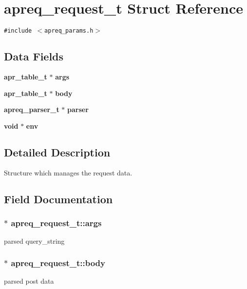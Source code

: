 \section{apreq\_\-request\_\-t  Struct Reference}
\label{structapreq__request__t}
{\tt \#include $<$apreq\_\-params.h$>$}

\subsection*{Data Fields}
\begin{CompactItemize}
\item 
{\bf apr\_\-table\_\-t} $\ast$ {\bf args}
\item 
{\bf apr\_\-table\_\-t} $\ast$ {\bf body}
\item 
{\bf apreq\_\-parser\_\-t} $\ast$ {\bf parser}
\item 
{\bf void} $\ast$ {\bf env}
\end{CompactItemize}


\subsection{Detailed Description}
Structure which manages the request data. 



\subsection{Field Documentation}
\subsubsection{$\ast$ apreq\_\-request\_\-t::args}\label{structapreq__request__t_m0}


parsed query\_\-string 
\subsubsection{$\ast$ apreq\_\-request\_\-t::body}\label{structapreq__request__t_m1}


parsed post data 
